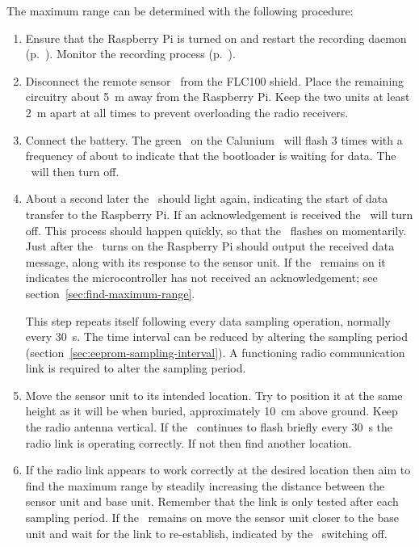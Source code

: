 The maximum range can be determined with the following procedure:
\begin{enumerate}
\item Ensure that the Raspberry Pi is turned on and restart the
  recording daemon (p.~\pageref{awnetd-restart}). Monitor the recording
  process (p.~\pageref{monitor-daemon-output}).
\item Disconnect the remote sensor \pcb\ from the FLC100 shield. Place
  the remaining circuitry about \SI{5}{\metre} away from the Raspberry
  Pi. Keep the two units at least \SI{2}{\metre} apart at all times to
  prevent overloading the radio receivers.
\item Connect the battery. The green \led\ on the Calunium \pcb\ will
  flash 3 times with a frequency of about  to indicate that the
  bootloader is waiting for data. The \led\ will then turn off.
\item \label{item-led-flash} About a second later the \led\ should
  light again, indicating the start of data transfer to the Raspberry
  Pi. If an acknowledgement is received the \led\ will turn off. This
  process should happen quickly, so that the \led\ flashes on
  momentarily. Just after the \led\ turns on the Raspberry Pi should
  output the received data message, along with its response to the
  sensor unit. If the \led\ remains on it indicates the
  microcontroller has not received an acknowledgement; see
  section~\ref{sec:find-maximum-range}.
  
  This step repeats itself following every data sampling operation,
  normally every \SI{30}{\second}. The time interval can be reduced by
  altering the sampling period
  (section~\ref{sec:eeprom-sampling-interval}). A functioning radio
  communication link is required to alter the sampling period.
\item Move the sensor unit to its intended location. Try to position
  it at the same height as it will be when buried, approximately
  \SI{10}{\centi\metre} above ground. Keep the radio antenna
  vertical. If the \led\ continues to flash briefly every
  \SI{30}{\second} the radio link is operating correctly. If not then
  find another location.
\item If the radio link appears to work correctly at the desired
  location then aim to find the maximum range by steadily increasing
  the distance between the sensor unit and base unit. Remember that the
  link is only tested after each sampling period. If the \led\ remains
  on move the sensor unit closer to the base unit and wait for the
  link to re-establish, indicated by the \led\ switching off.
\end{enumerate}

